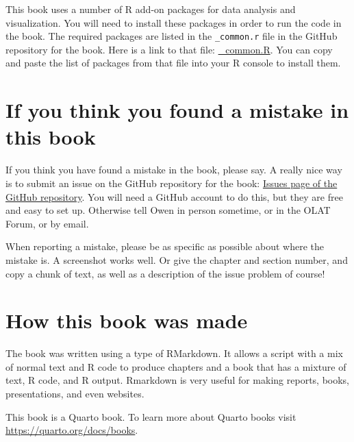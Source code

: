 \documentclass[
  letterpaper,
  8pt,
  a4paper]{book}
\begin{document}

This book uses a number of R add-on packages for data analysis and
visualization. You will need to install these packages in order to run
the code in the book. The required packages are listed in the
\texttt{\_common.r} file in the GitHub repository for the book. Here is
a link to that file:
\href{https://raw.githubusercontent.com/opetchey/BIO144_Course_Book/refs/heads/main/_common.R}{\_common.R}.
You can copy and paste the list of packages from that file into your R
console to install them.

\section*{If you think you found a mistake in this
book}\label{if-you-think-you-found-a-mistake-in-this-book}


If you think you have found a mistake in the book, please say. A really
nice way is to submit an issue on the GitHub repository for the book:
\href{https://github.com/opetchey/BIO144_Course_Book/issues}{Issues page
of the GitHub repository}. You will need a GitHub account to do this,
but they are free and easy to set up. Otherwise tell Owen in person
sometime, or in the OLAT Forum, or by email.

When reporting a mistake, please be as specific as possible about where
the mistake is. A screenshot works well. Or give the chapter and section
number, and copy a chunk of text, as well as a description of the issue
problem of course!

\section*{How this book was made}\label{how-this-book-was-made}


The book was written using a type of RMarkdown. It allows a script with
a mix of normal text and R code to produce chapters and a book that has
a mixture of text, R code, and R output. Rmarkdown is very useful for
making reports, books, presentations, and even websites.

This book is a Quarto book. To learn more about Quarto books visit
\url{https://quarto.org/docs/books}.
\end{document}
